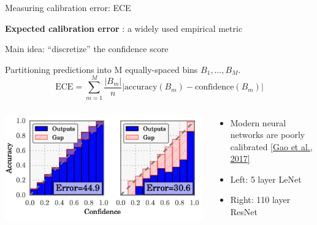 \documentclass[usenames,dvipsnames,notes,11pt,aspectratio=169,hyperref={colorlinks=true, linkcolor=blue}]{beamer}
\begin{document}
\begin{frame}
    {Measuring calibration error: ECE} 

    \textbf{Expected calibration error} : a widely used empirical metric

    Main idea: ``discretize'' the confidence score

    Partitioning predictions into M equally-spaced bins $B_1,\ldots, B_M$.\pause
    $$
    \text{ECE} = \sum_{m=1}^M \frac{|B_m|}{n}
    \left \vert\text{accuracy}(B_m) - \text{confidence}(B_m)\right\vert 
    $$

    \begin{columns}
        \begin{column}{0.5\textwidth}
            \includegraphics[width=\textwidth]{figures/nn-calibration}
        \end{column}
        \begin{column}{0.5\textwidth}
            \begin{itemize}
                \item Modern neural networks are poorly calibrated \href{https://arxiv.org/pdf/1706.04599.pdf}{[Gao et al., 2017]}
                \item Left: 5 layer LeNet
                \item Right: 110 layer ResNet
            \end{itemize}
        \end{column}
    \end{columns}
\end{frame}
\end{document}
